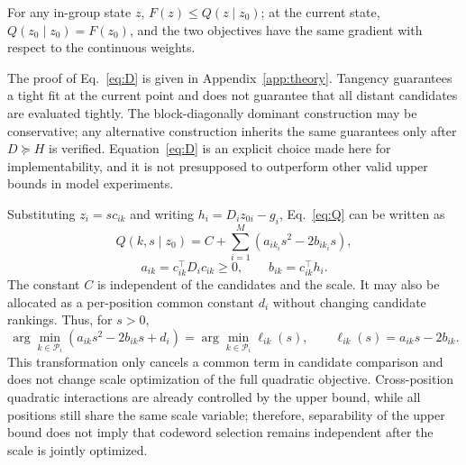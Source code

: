 \begin{proposition}[Valid upper bound and tangency]
For any in-group state $z$, $F(z)\le Q(z\mid z_0)$; at the current state, $Q(z_0\mid z_0)=F(z_0)$, and the two objectives have the same gradient with respect to the continuous weights.
\end{proposition}
The proof of Eq.~\eqref{eq:D} is given in Appendix~\ref{app:theory}.
Tangency guarantees a tight fit at the current point and does not guarantee that all distant candidates are evaluated tightly.
The block-diagonally dominant construction may be conservative; any alternative construction inherits the same guarantees only after $D\succeq H$ is verified.
Equation~\eqref{eq:D} is an explicit choice made here for implementability, and it is not presupposed to outperform other valid upper bounds in model experiments.

Substituting $z_i=sc_{ik}$ and writing $h_i=D_i z_{0i}-g_i$, Eq.~\eqref{eq:Q} can be written as
\begin{equation}
Q(k,s\mid z_0)=C+\sum_{i=1}^{M}\left(a_{ik_i}s^2-2b_{ik_i}s\right),
\label{eq:Qks}
\end{equation}
\begin{equation}
a_{ik}=c_{ik}^\top D_i c_{ik}\ge0,\qquad b_{ik}=c_{ik}^\top h_i.
\label{eq:ab}
\end{equation}
The constant $C$ is independent of the candidates and the scale.
It may also be allocated as a per-position common constant $d_i$ without changing candidate rankings.
Thus, for $s>0$,
\begin{equation}
\arg\min_{k\in\mathcal P_i}\left(a_{ik}s^2-2b_{ik}s+d_i\right)
=\arg\min_{k\in\mathcal P_i}\ell_{ik}(s),\qquad
\ell_{ik}(s)=a_{ik}s-2b_{ik}.
\label{eq:lines}
\end{equation}
This transformation only cancels a common term in candidate comparison and does not change scale optimization of the full quadratic objective.
Cross-position quadratic interactions are already controlled by the upper bound, while all positions still share the same scale variable; therefore, separability of the upper bound does not imply that codeword selection remains independent after the scale is jointly optimized.

